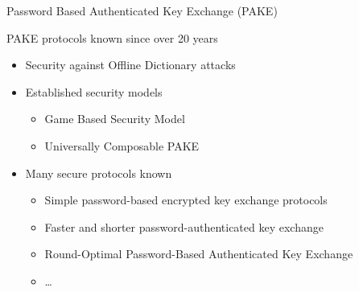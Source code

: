 \documentclass[notes]{beamer}
\begin{document}
\begin{frame}{Password Based Authenticated Key Exchange (PAKE)}{}

	PAKE protocols known since over 20 years\\
	
	\begin{itemize}
		\item Security against Offline Dictionary attacks
		\item Established security models
		\begin{itemize}
			\item Game Based Security Model \cite{Bellare2000}%
			\item Universally Composable PAKE \cite{Canetti2005}%
		\end{itemize}
		\item Many secure protocols known
		\begin{itemize}
			\item Simple password-based encrypted key exchange protocols \cite{Abdalla2005}
			\item Faster and shorter password-authenticated key exchange \cite{Gennaro2008}
			\item Round-Optimal Password-Based Authenticated Key Exchange \cite{Katz2011}
			\item \dots
		\end{itemize}
	\end{itemize}	

\end{frame}
\end{document}
